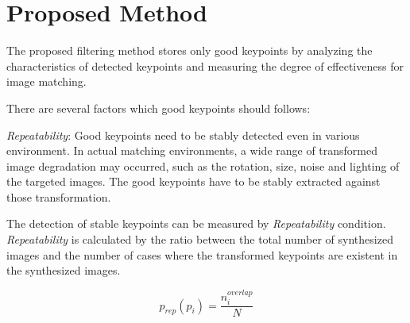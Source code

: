 
\section{Proposed Method}
\label{sec:proposed}



The proposed filtering method stores only good keypoints by analyzing the characteristics of detected keypoints and measuring the degree of effectiveness for image matching. 

There are several factors which good keypoints should follows:

\textit{Repeatability}: Good keypoints need to be stably detected even in various environment. In actual matching environments, a wide range of transformed image degradation may occurred, such as the rotation, size, noise and lighting of the targeted images. The good keypoints have to be stably extracted against those transformation.

The detection of stable keypoints can be measured by \textit{Repeatability} condition. \textit{Repeatability} is calculated by the ratio between the total number of synthesized images and the number of cases where the transformed keypoints are existent in the synthesized images.


\begin{equation}
p_{rep}(p_i) = \frac{n_i^{overlap}}{N}
\end{equation}


